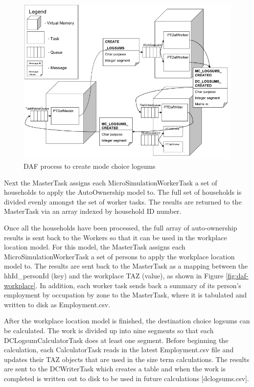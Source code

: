 \begin{figure}
\centering
\includegraphics[width=5.2in]{pt/figure75}
\caption{DAF process to create mode choice logsums}
\label{fig:daf-process}
\end{figure}

Next the MasterTask assigns each MicroSimulationWorkerTask a set of households to apply the AutoOwnership model to. The full set of households is divided evenly amongst the set of worker tasks. The results are returned to the MasterTask via an array indexed by household ID number. 

Once all the households have been processed, the full array of auto-ownership results is sent back to the Workers so that it can be used in the workplace location model. For this model, the MasterTask assigns each MicroSimulationWorkerTask a set of persons to apply the workplace location model to. The results are sent back to the MasterTask as a mapping between the hhId\_personId (key) and the workplace TAZ (value), as shown in Figure \ref{fig:daf-workplace}. In addition, each worker task sends back a summary of its person's employment by occupation by zone to the MasterTask, where it is tabulated and written to disk as Employment.csv. 


After the workplace location model is finished, the destination choice logsums can be calculated. The work is divided up into nine segments so that each DCLogsumCalculatorTask does at least one segment. Before beginning the calculation, each CalculatorTask reads in the latest Employment.csv file and updates their TAZ objects that are used in the size term calculations. The results are sent to the DCWriterTask which creates a table and when the work is completed is written out to disk to be used in future calculations [dclogsums.csv]. 

